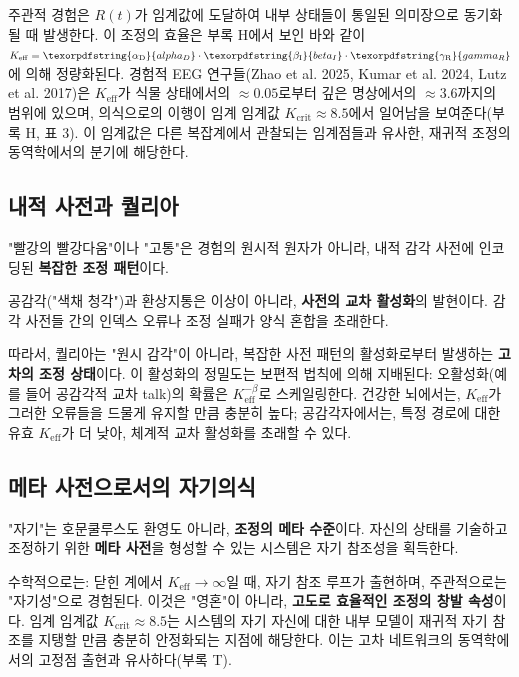 \documentclass[12pt,a4paper]{article}
\DeclareRobustCommand{\alD}{\texorpdfstring{\ensuremath{\alpha_{\mathrm{D}}}}{alpha_D}}
\DeclareRobustCommand{\beI}{\texorpdfstring{\ensuremath{\beta_{\mathrm{I}}}}{beta_I}}
\DeclareRobustCommand{\gaR}{\texorpdfstring{\ensuremath{\gamma_{\mathrm{R}}}}{gamma_R}}
\newcommand{\eff}{\mathrm{eff}}
\newcommand{\Ke}{K_{\eff}}
\newcommand{\Kcrit}{K_{\mathrm{crit}}}
\begin{document}
	주관적 경험은 $R(t)$가 임계값에 도달하여 내부 상태들이 통일된 의미장으로 동기화될 때 발생한다. 이 조정의 효율은 부록 H에서 보인 바와 같이 \(\Ke = \alD \cdot \beI \cdot \gaR\)에 의해 정량화된다. 경험적 EEG 연구들(Zhao et al. 2025, Kumar et al. 2024, Lutz et al. 2017)은 \(\Ke\)가 식물 상태에서의 \(\approx 0.05\)로부터 깊은 명상에서의 \(\approx 3.6\)까지의 범위에 있으며, 의식으로의 이행이 임계 임계값 \(\Kcrit \approx 8.5\)에서 일어남을 보여준다(부록 H, 표 3). 이 임계값은 다른 복잡계에서 관찰되는 임계점들과 유사한, 재귀적 조정의 동역학에서의 분기에 해당한다.
	
	\subsection{내적 사전과 퀄리아}
	
	"빨강의 빨강다움"이나 "고통"은 경험의 원시적 원자가 아니라, 내적 감각 사전에 인코딩된 \textbf{복잡한 조정 패턴}이다.
	
	\begin{tcolorbox}[title=예: 공감각과 환상지통]
		공감각("색채 청각")과 환상지통은 이상이 아니라, \textbf{사전의 교차 활성화}의 발현이다. 감각 사전들 간의 인덱스 오류나 조정 실패가 양식 혼합을 초래한다.
	\end{tcolorbox}
	
	따라서, 퀄리아는 "원시 감각"이 아니라, 복잡한 사전 패턴의 활성화로부터 발생하는 \textbf{고차의 조정 상태}이다. 이 활성화의 정밀도는 보편적 법칙에 의해 지배된다: 오활성화(예를 들어 공감각적 교차 talk)의 확률은 \(\Ke^{-\beta}\)로 스케일링한다. 건강한 뇌에서는, \(\Ke\)가 그러한 오류들을 드물게 유지할 만큼 충분히 높다; 공감각자에서는, 특정 경로에 대한 유효 \(\Ke\)가 더 낮아, 체계적 교차 활성화를 초래할 수 있다.
	
	\subsection{메타 사전으로서의 자기의식}
	
	"자기"는 호문쿨루스도 환영도 아니라, \textbf{조정의 메타 수준}이다. 자신의 상태를 기술하고 조정하기 위한 \textbf{메타 사전}을 형성할 수 있는 시스템은 자기 참조성을 획득한다.
	
	수학적으로는: 닫힌 계에서 \(\Ke \to \infty\)일 때, 자기 참조 루프가 출현하며, 주관적으로는 "자기성"으로 경험된다. 이것은 "영혼"이 아니라, \textbf{고도로 효율적인 조정의 창발 속성}이다. 임계 임계값 \(\Kcrit \approx 8.5\)는 시스템의 자기 자신에 대한 내부 모델이 재귀적 자기 참조를 지탱할 만큼 충분히 안정화되는 지점에 해당한다. 이는 고차 네트워크의 동역학에서의 고정점 출현과 유사하다(부록 T).
	
\end{document}
